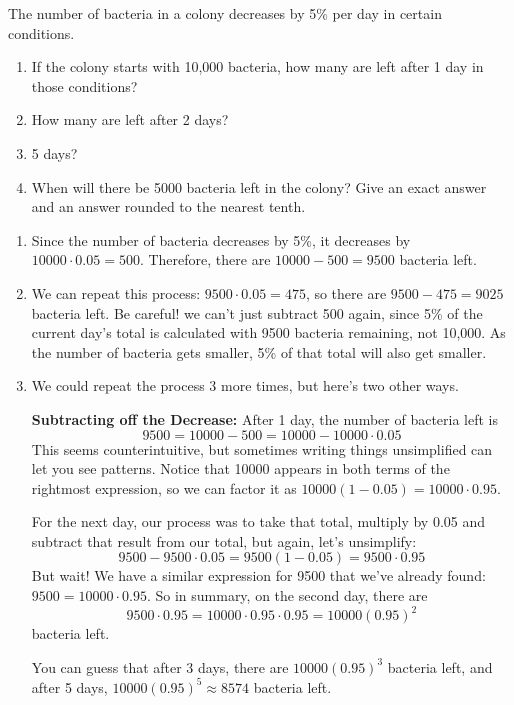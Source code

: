 \documentclass[noauthor]{ximera}
\begin{document}
\begin{problem}
The number of bacteria in a colony decreases by 5\% per day in certain conditions.

\begin{enumerate}
    \item If the colony starts with 10,000 bacteria, how many are left
    after 1 day in those conditions?
    \item How many are left after 2 days?
    \item 5 days?
    \item When will there be 5000 bacteria left in the colony? Give an exact answer and an answer rounded to the nearest tenth. 
\end{enumerate}

\begin{explanation}
\begin{enumerate}
    \item Since the number of bacteria decreases by 5\%, it decreases by \(10000 \cdot 0.05 = 500\). Therefore, there are \(10000 - 500 = 9500\) bacteria left.
    \item We can repeat this process: \(9500 \cdot 0.05 = 475\), so there are \(9500 - 475 = 9025\) bacteria left. 
    Be careful! we can't just subtract 500 again, since 5\% of the current day's total is calculated with 9500 bacteria remaining, not 10,000. As the number of bacteria
    gets smaller, 5\% of that total will also get smaller.
    \item We could repeat the process 3 more times, but here's two other ways. 
    
    \textbf{Subtracting off the Decrease:} After 1 day, the number of bacteria left is
    \[9500 = 10000 - 500 = 10000 - 10000 \cdot 0.05\]
    This seems counterintuitive, but sometimes writing things unsimplified can let you see patterns. 
    Notice that 10000 appears in both terms of the rightmost expression, so we can factor it as \(10000(1 - 0.05) = 10000 \cdot 0.95\).
    
    For the next day, our process was to take that total, multiply by 0.05 and subtract that result from our total, but again, let's unsimplify:
    \[9500 - 9500 \cdot 0.05 = 9500(1 - 0.05) = 9500 \cdot 0.95\] 
    But wait! We have a similar expression for 9500 that we've already found: \(9500 = 10000 \cdot 0.95\). So in summary, on the second day, there are 
    \[9500 \cdot 0.95 = 10000 \cdot 0.95 \cdot 0.95 = 10000(0.95)^2\]
    bacteria left. 

    You can guess that after 3 days, there are \(10000(0.95)^3\) bacteria left, and after 5 days, \(10000(0.95)^5 \approx 8574\) bacteria left.


\end{enumerate}
\end{explanation}
\end{problem}
\end{document}
